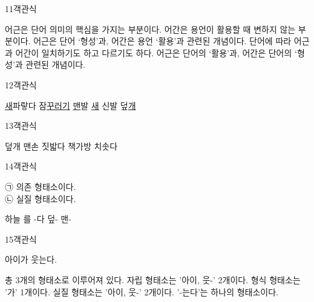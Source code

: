\documentclass[fs9,seriesRus]{korfarm-base}
\begin{document}
\begin{kfQBlock}{11}{객관식}
\begin{kfChoices}
\kfChoice 어근은 단어 의미의 핵심을 가지는 부분이다.
\kfChoice 어간은 용언이 활용할 때 변하지 않는 부분이다.
\kfChoice 어근은 단어 ‘형성’과, 어간은 용언 ‘활용’과 관련된 개념이다.
\kfChoice 단어에 따라 어근과 어간이 일치하기도 하고 다르기도 하다.
\kfChoice 어근은 단어의 ‘활용’과, 어간은 단어의 ‘형성’과 관련된 개념이다.
\end{kfChoices}
\end{kfQBlock}
\begin{kfQBlock}{12}{객관식}
\begin{kfChoices}
\kfChoice \uline{새}파랗다
\kfChoice 잠\uline{꾸러기}
\kfChoice \uline{맨}발
\kfChoice \uline{새} 신발
\kfChoice 덮\uline{개}
\end{kfChoices}
\end{kfQBlock}
\begin{kfQBlock}{13}{객관식}
\begin{kfChoices}
\kfChoice 덮개
\kfChoice 맨손
\kfChoice 짓밟다
\kfChoice 책가방
\kfChoice 치솟다
\end{kfChoices}
\end{kfQBlock}
\begin{kfQBlock}{14}{객관식}
\begin{kfEvidence}㉠ 의존 형태소이다. \\\relax
㉡ 실질 형태소이다.\end{kfEvidence}
\begin{kfChoices}
\kfChoice 하늘
\kfChoice 를
\kfChoice -다
\kfChoice 덮-
\kfChoice 맨-
\end{kfChoices}
\end{kfQBlock}
\begin{kfQBlock}{15}{객관식}
\begin{kfEvidence}아이가 웃는다.\end{kfEvidence}
\begin{kfChoices}
\kfChoice 총 3개의 형태소로 이루어져 있다.
\kfChoice 자립 형태소는 '아이, 웃-' 2개이다.
\kfChoice 형식 형태소는 '가' 1개이다.
\kfChoice 실질 형태소는 '아이, 웃-' 2개이다.
\kfChoice '-는다'는 하나의 형태소이다.
\end{kfChoices}
\end{kfQBlock}
\end{document}
